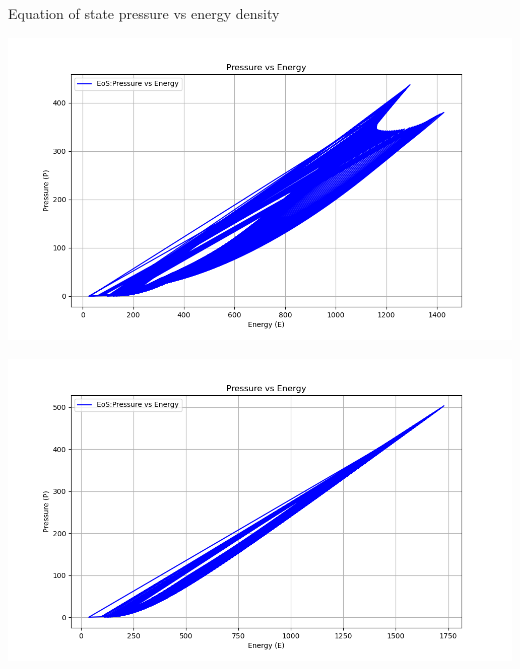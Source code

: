 \documentclass[12pt,aspectratio169]{beamer}
\begin{document}
\begin{frame}{Equation of state pressure vs energy density}
\begin{minipage}[t]{0.48\textwidth}
  \centering
  \includegraphics[width=0.9\linewidth]{pressure_vs_energy1.png}
\end{minipage}
\hfill
\begin{minipage}[t]{0.48\textwidth}
  \centering
  \includegraphics[width=0.9\linewidth]{pressure_vs_energy2.png}
\end{minipage}

\vspace{0.5cm}


\end{frame}
\end{document}

